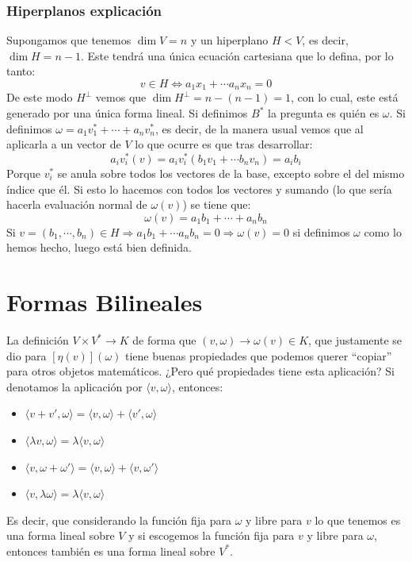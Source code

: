 \documentclass[10pt,a4paper,openright]{book}
\theoremstyle{break}
\begin{document}
\subsubsection{Hiperplanos explicación}
Supongamos que tenemos $\dim V=n$ y un hiperplano $H<V$, es decir, $\dim H=n-1$. Este tendrá una única ecuación cartesiana que lo defina, por lo tanto:
$$v\in H\Leftrightarrow a_1x_1+\cdots a_nx_n=0$$
De este modo $H^\perp$ vemos que $\dim H^\perp = n-(n-1)=1$, con lo cual, este está generado por una única forma lineal. Si definimos $B^*$ la pregunta es quién es $\omega$. Si definimos $\omega=a_1v_1^*+\cdots + a_nv_n^*$, es decir, de la manera usual vemos que al aplicarla a un vector de $V$ lo que ocurre es que tras desarrollar:
$$a_iv_i^*(v) = a_iv_i^*(b_1v_1+\cdots b_nv_n)=a_ib_i$$
Porque $v_i^*$ se anula sobre todos los vectores de la base, excepto sobre el del mismo índice que él. Si esto lo hacemos con todos los vectores y sumando (lo que sería hacerla evaluación normal de $\omega(v)$) se tiene que:
$$\omega(v)=a_1b_1+\cdots +a_nb_n$$
Si $v=(b_1, \cdots, b_n)\in H\Rightarrow a_1b_1+\cdots a_nb_n=0\Rightarrow \omega(v)=0$ si definimos $\omega$ como lo hemos hecho, luego está bien definida.

\section{Formas Bilineales}
\label{Formas bilineales}
La definición $V\times V^* \rightarrow K$ de forma que $(v,\omega)\rightarrow \omega(v)\in K$, que justamente se dio para $\left[\eta(v)\right](\omega)$ tiene buenas propiedades que podemos querer ``copiar'' para otros objetos matemáticos. ¿Pero qué propiedades tiene esta aplicación? Si denotamos la aplicación por $\langle v,\omega\rangle$, entonces:
\begin{itemize}
\item $\langle v+v',\omega\rangle=\langle v,\omega\rangle+\langle v',\omega\rangle$
\item $\langle\lambda v,\omega\rangle = \lambda \langle v,\omega\rangle$
\item $\langle v,\omega+\omega'\rangle =\langle v,\omega\rangle+\langle v,\omega'\rangle$
\item $\langle v,\lambda\omega\rangle = \lambda \langle v,\omega\rangle$
\end{itemize}
Es decir, que considerando la función fija para $\omega$ y libre para $v$ lo que tenemos es una forma lineal sobre $V$ y si escogemos la función fija para $v$ y libre para $\omega$, entonces también es una forma lineal sobre $V^*$.
\end{document}
